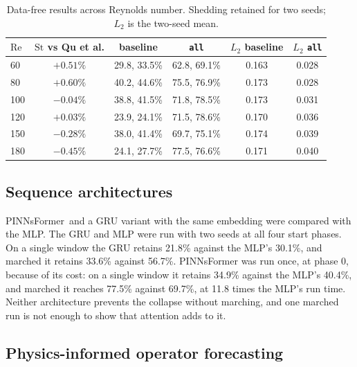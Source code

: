 \documentclass[11pt,a4paper]{article}
\newcommand{\Rey}{\mathrm{Re}}
\newcommand{\St}{\mathrm{St}}
\begin{document}
\begin{table}[h]
\centering
\caption{Data-free results across Reynolds number. Shedding retained for two
seeds; $L_2$ is the two-seed mean.}
\label{tab:resweep}
\begin{tabular}{lccccc}
\toprule
$\Rey$ & $\St$ vs Qu et al. & baseline & \texttt{all} & $L_2$ baseline & $L_2$ \texttt{all} \\
\midrule
60  & $+0.51\%$ & 29.8, 33.5\% & 62.8, 69.1\% & 0.163 & 0.028 \\
80  & $+0.60\%$ & 40.2, 44.6\% & 75.5, 76.9\% & 0.173 & 0.028 \\
100 & $-0.04\%$ & 38.8, 41.5\% & 71.8, 78.5\% & 0.173 & 0.031 \\
120 & $+0.03\%$ & 23.9, 24.1\% & 71.5, 78.6\% & 0.170 & 0.036 \\
150 & $-0.28\%$ & 38.0, 41.4\% & 69.7, 75.1\% & 0.174 & 0.039 \\
180 & $-0.45\%$ & 24.1, 27.7\% & 77.5, 76.6\% & 0.171 & 0.040 \\
\bottomrule
\end{tabular}
\end{table}

\subsection{Sequence architectures}

PINNsFormer\,\cite{zhao2024pinnsformer} and a GRU variant with the same
embedding were compared with the MLP. The GRU and MLP were run with two seeds
at all four start phases. On a single window the GRU retains 21.8\% against
the MLP's 30.1\%, and marched it retains 33.6\% against 56.7\%. PINNsFormer
was run once, at phase 0, because of its cost: on a single window it retains
34.9\% against the MLP's 40.4\%, and marched it reaches 77.5\% against
69.7\%, at 11.8 times the MLP's run time. Neither architecture prevents the
collapse without marching, and one marched run is not enough to show that
attention adds to it.

\subsection{Physics-informed operator forecasting}
\end{document}
